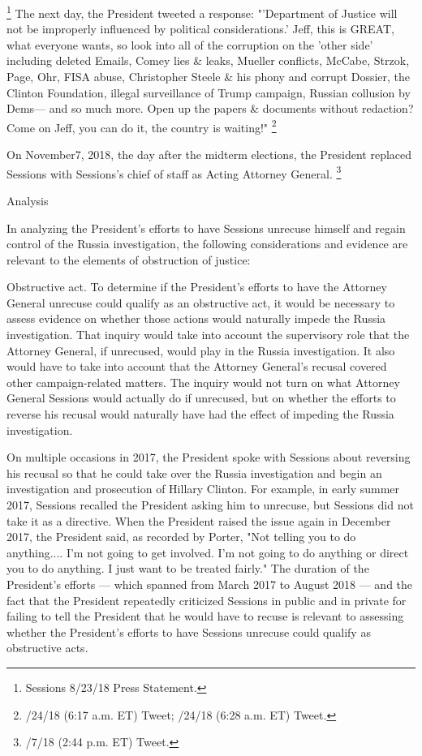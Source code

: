 \footnote{Sessions 8/23/18 Press Statement.}
The next day, the President tweeted a response: "'Department of Justice will not be improperly influenced by political considerations.'
Jeff, this is GREAT, what everyone wants, so look into all of the corruption on the 'other side' including deleted Emails, Comey lies \& leaks, Mueller conflicts, McCabe, Strzok, Page, Ohr, FISA abuse, Christopher Steele \& his phony and corrupt Dossier, the Clinton Foundation, illegal surveillance of Trump campaign, Russian collusion by Dems— and so much more.
Open up the papers \& documents without redaction? Come on Jeff, you can do it, the country is waiting!"%
\footnote{/24/18 (6:17 a.m. ET) Tweet;
/24/18 (6:28 a.m. ET) Tweet.}

On November7, 2018, the day after the midterm elections, the President replaced Sessions with Sessions's chief of staff as Acting Attorney General.%
\footnote{/7/18 (2:44 p.m. ET) Tweet.}

Analysis

In analyzing the President's efforts to have Sessions unrecuse himself and regain control of the Russia investigation, the following considerations and evidence are relevant to the elements of obstruction of justice:

Obstructive act.
To determine if the President's efforts to have the Attorney General unrecuse could qualify as an obstructive act, it would be necessary to assess evidence on whether those actions would naturally impede the Russia investigation.
That inquiry would take into account the supervisory role that the Attorney General, if unrecused, would play in the Russia investigation.
It also would have to take into account that the Attorney General's recusal covered other campaign-related matters.
The inquiry would not turn on what Attorney General Sessions would actually do if unrecused, but on whether the efforts to reverse his recusal would naturally have had the effect of impeding the Russia investigation.

On multiple occasions in 2017, the President spoke with Sessions about reversing his recusal so that he could take over the Russia investigation and begin an investigation and prosecution of Hillary Clinton.
For example, in early summer 2017, Sessions recalled the President asking him to unrecuse, but Sessions did not take it as a directive.
When the President raised the issue again in December 2017, the President said, as recorded by Porter, "Not telling you to do anything....
I'm not going to get involved.
I'm not going to do anything or direct you to do anything.
I just want to be treated fairly."
The duration of the President's efforts — which spanned from March 2017 to August 2018 — and the fact that the President repeatedly criticized Sessions in public and in private for failing to tell the President that he would have to recuse is relevant to assessing whether the President's efforts to have Sessions unrecuse could qualify as obstructive acts.

